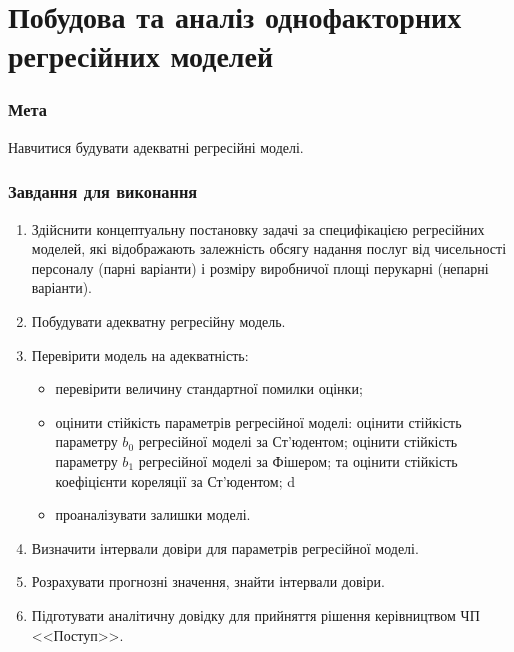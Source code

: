 



\newcommand{\labnumber}{2} %



\graphicspath{{figures/}}


\Ukrainian


\addtocounter{page}{1}

\section*{Побудова та аналіз однофакторних регресійних моделей}
\subsubsection*{Мета}
Навчитися будувати адекватні регресійні моделі.
\subsubsection*{Завдання для виконання}
\begin{enumerate}
    \item Здійснити концептуальну постановку задачі за специфікацією регресійних моделей, які відображають залежність обсягу надання послуг від чисельності персоналу (парні варіанти) і розміру виробничої площі перукарні (непарні варіанти).
    \item Побудувати адекватну регресійну модель. 
    \item Перевірити модель на адекватність:
    \begin{itemize}
        \item перевірити величину стандартної помилки оцінки; 
        \item оцінити стійкість параметрів регресійної моделі: оцінити стійкість параметру $b_0$ регресійної моделі за Ст'юдентом; оцінити стійкість параметру $b_1$ регресійної моделі за Фішером; та оцінити стійкість коефіцієнти кореляції за Ст'юдентом;
 d            \item проаналізувати залишки моделі.
    \end{itemize}
    \item Визначити інтервали довіри для параметрів регресійної моделі.
    \item Розрахувати прогнозні значення, знайти інтервали довіри.
    \item Підготувати аналітичну довідку для прийняття рішення керівництвом ЧП <<Поступ>>.
\end{enumerate}

